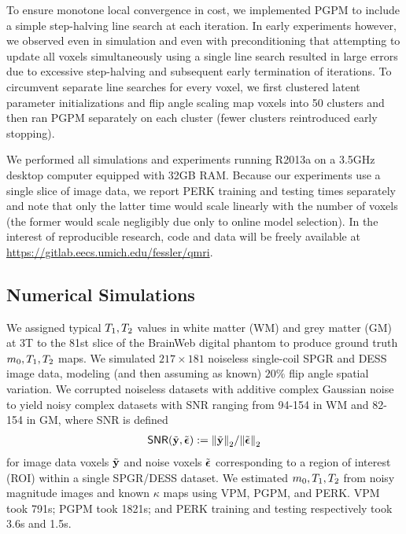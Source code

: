 To ensure monotone local convergence in cost,
we implemented PGPM to include 
a simple step-halving line search at each iteration.
In early experiments however,
we observed even in simulation 
and even with preconditioning
that attempting to update all voxels simultaneously 
using a single line search 
resulted in large errors
due to excessive step-halving 
and subsequent early termination of iterations. 
To circumvent separate line searches for every voxel,
we first clustered latent parameter initializations
and flip angle scaling map voxels into 50 clusters
and then ran PGPM separately on each cluster
(fewer clusters reintroduced early stopping).

We performed all simulations and experiments
running \matlab R2013a
on a 3.5GHz desktop computer
equipped with 32GB RAM. 
Because our experiments use a single slice of image data,
we report PERK training and testing times separately 
and note that only the latter time 
would scale linearly with the number of voxels
(the former would scale negligibly 
due only to online model selection).
In the interest of reproducible research,
code and data will be freely available
at \url{https://gitlab.eecs.umich.edu/fessler/qmri}.

\subsection{Numerical Simulations}
\label{ss,perk,exp,sim}

We assigned typical $T_1,T_2$ values 
in white matter (WM) and grey matter (GM) at 3T
\cite{wansapura:99:nrt}
to the 81st slice 
of the BrainWeb digital phantom
\cite{collins:98:dac}
to produce ground truth $m_0,T_1,T_2$ maps.
We simulated $217 \times 181$
noiseless single-coil SPGR and DESS image data,
modeling (and then assuming as known)
$20\%$ flip angle spatial variation.
We corrupted noiseless datasets
with additive complex Gaussian noise
to yield noisy complex datasets 
with SNR ranging from 94-154 in WM and 82-154 in GM,
where SNR is defined
\begin{align}
	\snr{\bmyt,\bmepst} := \norm{\bmyt}_2/\norm{\bmepst}_2
	\label{eq:perk,snr}
\end{align}
for image data voxels $\tilde{\mathbf{y}}$ and noise voxels $\tilde{\boldsymbol{\epsilon}}$
corresponding to a region of interest (ROI)
within a single SPGR/DESS dataset.
We estimated $m_0,T_1,T_2$ 
from noisy magnitude images and known $\kappa$ maps
using VPM, PGPM, and PERK.
VPM took 791s;
PGPM took 1821s;
and 
PERK training and testing respectively took 3.6s and 1.5s.

